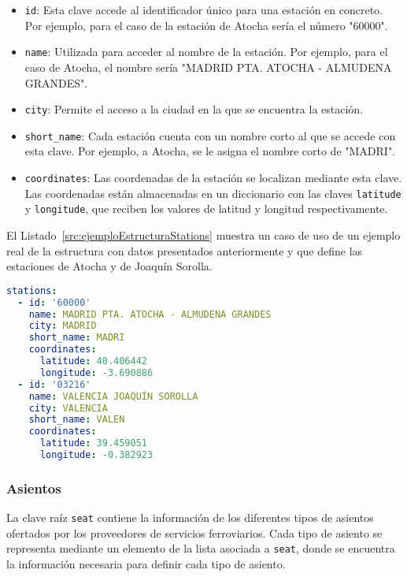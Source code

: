 \begin{itemize}
    \item \texttt{id}: Esta clave accede al identificador único para una estación en concreto. Por ejemplo, para el caso de la estación de Atocha sería el número "60000".
    \item \texttt{name}: Utilizada para acceder al nombre de la estación. Por ejemplo, para el caso de Atocha, el nombre sería "MADRID PTA. ATOCHA - ALMUDENA GRANDES".
    \item \texttt{city}: Permite el acceso a la ciudad en la que se encuentra la estación. 
    \item \texttt{short\_name}: Cada estación cuenta con un nombre corto al que se accede con esta clave. Por ejemplo, a Atocha, se le asigna el nombre corto de "MADRI".
    \item \texttt{coordinates}: Las coordenadas de la estación se localizan mediante esta clave. Las coordenadas están almacenadas en un diccionario con las claves \texttt{latitude} y \texttt{longitude}, que reciben los valores de latitud y longitud respectivamente.
\end{itemize}

El Listado~\ref{src:ejemploEstructuraStations} muestra un caso de uso de un ejemplo real de la estructura con datos presentados anteriormente y que define las estaciones de Atocha y de Joaquín Sorolla.

\begin{lstlisting}[language=YAML,
                   frame=none,
                   numbers=none,
                   basicstyle=\ttfamily\normalsize,
                   caption={Ejemplo con datos reales de la estructura de \texttt{stations}},
                   label=src:ejemploEstructuraStations,
                   inputencoding=utf8]
stations:
  - id: '60000'
    name: MADRID PTA. ATOCHA - ALMUDENA GRANDES
    city: MADRID
    short_name: MADRI
    coordinates:
      latitude: 40.406442
      longitude: -3.690886
  - id: '03216'
    name: VALENCIA JOAQUÍN SOROLLA
    city: VALENCIA
    short_name: VALEN
    coordinates:
      latitude: 39.459051
      longitude: -0.382923
\end{lstlisting}

\subsubsection{Asientos}

La clave raíz \texttt{seat} contiene la información de los diferentes tipos de asientos ofertados por los proveedores de servicios ferroviarios. Cada tipo de asiento se representa mediante un elemento de la lista asociada a \texttt{seat}, donde se encuentra la información necesaria para definir cada tipo de asiento. 


